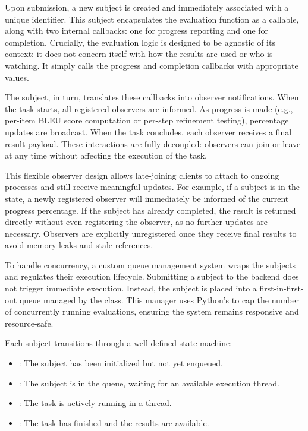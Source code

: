 Upon submission, a new subject is created and immediately associated with a unique identifier. This
subject encapsulates the evaluation function as a callable, along with two internal callbacks: one
for progress reporting and one for completion. Crucially, the evaluation logic is designed to be
agnostic of its context: it does not concern itself with how the results are used or who is watching.
It simply calls the progress and completion callbacks with appropriate values.

The subject, in turn, translates these callbacks into observer notifications. When the task starts,
all registered observers are informed. As progress is made (e.g., per-item BLEU score computation or
per-step refinement testing), percentage updates are broadcast. When the task concludes, each
observer receives a final result payload. These interactions are fully decoupled: observers can join
or leave at any time without affecting the execution of the task.

This flexible observer design allows late-joining clients to attach to ongoing processes and still
receive meaningful updates. For example, if a subject is in the  state, a newly
registered observer will immediately be informed of the current progress percentage. If the subject
has already completed, the result is returned directly without even registering the observer, as no
further updates are necessary. Observers are explicitly unregistered once they receive final results
to avoid memory leaks and stale references.

To handle concurrency, a custom queue management system wraps the subjects and regulates their
execution lifecycle. Submitting a subject to the backend does not trigger immediate execution.
Instead, the subject is placed into a first-in-first-out queue managed by the 
class. This manager uses Python’s  to cap the number of concurrently
running evaluations, ensuring the system remains responsive and resource-safe.

Each subject transitions through a well-defined state machine:
\begin{itemize}
	\item {}: The subject has been initialized but not yet enqueued.
	\item {}: The subject is in the queue, waiting for an available execution thread.
	\item {}: The task is actively running in a thread.
	\item {}: The task has finished and the results are available.
\end{itemize}

